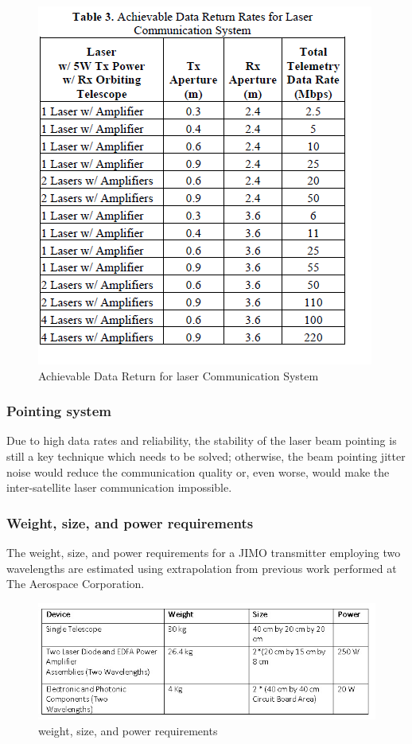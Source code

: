 \begin{figure}[htb]
\begin{center}
\includegraphics[width=0.7\columnwidth]{figures/laser-communication/bh5.png}
\caption{Achievable Data Return for laser Communication System}
\end{center}
\end{figure}

\subsubsection{Pointing system}

Due to high data rates and reliability, the stability of the laser beam pointing is still a key technique which needs to be solved; otherwise, the beam pointing jitter noise would reduce the communication quality or, even worse, would make the inter-satellite laser communication impossible. 

\subsubsection{Weight, size, and power requirements}

The weight, size, and power requirements for a JIMO transmitter employing two wavelengths are estimated using extrapolation from previous work performed at The Aerospace Corporation.
\begin{figure}[htb]
\begin{center}
\includegraphics[width=1\columnwidth]{figures/laser-communication/bh11.jpg}
\caption{weight, size, and power requirements}
\end{center}
\end{figure}

